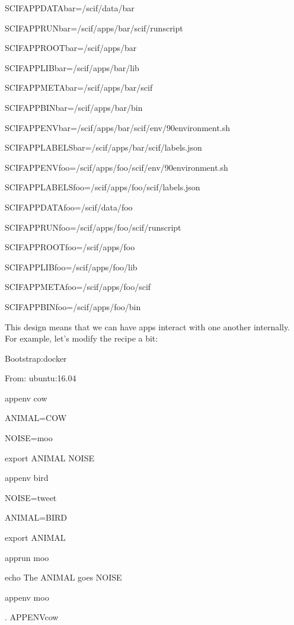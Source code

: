 \documentclass[letterpaper,10pt,english]{sphinxmanual}
\begin{document}
%
\begin{sphinxVerbatim}[commandchars=\\\{\}]
SCIF\PYGZus{}APPDATA\PYGZus{}bar=/scif/data/bar

SCIF\PYGZus{}APPRUN\PYGZus{}bar=/scif/apps/bar/scif/runscript

SCIF\PYGZus{}APPROOT\PYGZus{}bar=/scif/apps/bar

SCIF\PYGZus{}APPLIB\PYGZus{}bar=/scif/apps/bar/lib

SCIF\PYGZus{}APPMETA\PYGZus{}bar=/scif/apps/bar/scif

SCIF\PYGZus{}APPBIN\PYGZus{}bar=/scif/apps/bar/bin

SCIF\PYGZus{}APPENV\PYGZus{}bar=/scif/apps/bar/scif/env/90\PYGZhy{}environment.sh

SCIF\PYGZus{}APPLABELS\PYGZus{}bar=/scif/apps/bar/scif/labels.json


SCIF\PYGZus{}APPENV\PYGZus{}foo=/scif/apps/foo/scif/env/90\PYGZhy{}environment.sh

SCIF\PYGZus{}APPLABELS\PYGZus{}foo=/scif/apps/foo/scif/labels.json

SCIF\PYGZus{}APPDATA\PYGZus{}foo=/scif/data/foo

SCIF\PYGZus{}APPRUN\PYGZus{}foo=/scif/apps/foo/scif/runscript

SCIF\PYGZus{}APPROOT\PYGZus{}foo=/scif/apps/foo

SCIF\PYGZus{}APPLIB\PYGZus{}foo=/scif/apps/foo/lib

SCIF\PYGZus{}APPMETA\PYGZus{}foo=/scif/apps/foo/scif

SCIF\PYGZus{}APPBIN\PYGZus{}foo=/scif/apps/foo/bin
\end{sphinxVerbatim}

This design means that we can have apps interact with one another internally. For example, let’s modify the recipe a bit:

%
\begin{sphinxVerbatim}[commandchars=\\\{\}]
Bootstrap:docker

From: ubuntu:16.04


\PYGZpc{}appenv cow

    ANIMAL=COW

    NOISE=moo

    export ANIMAL NOISE


\PYGZpc{}appenv bird

    NOISE=tweet

    ANIMAL=BIRD

    export ANIMAL


\PYGZpc{}apprun moo

    echo The \PYGZdl{}\PYGZob{}ANIMAL\PYGZcb{} goes \PYGZdl{}\PYGZob{}NOISE\PYGZcb{}


\PYGZpc{}appenv moo

    . \PYGZdl{}\PYGZob{}APPENV\PYGZus{}cow\PYGZcb{}
\end{sphinxVerbatim}
\end{document}

